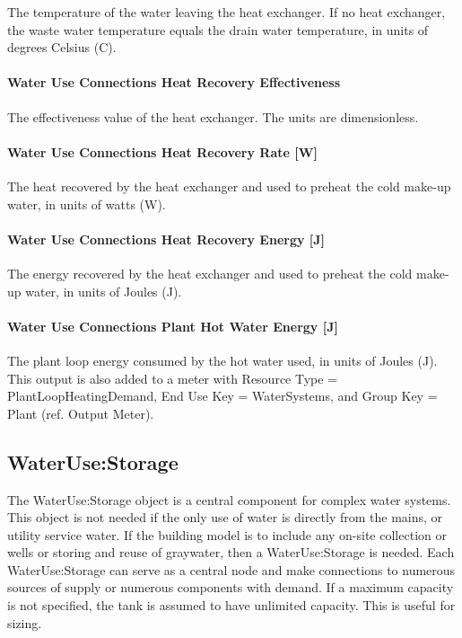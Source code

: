 The temperature of the water leaving the heat exchanger. If no heat exchanger, the waste water temperature equals the drain water temperature, in units of degrees Celsius (C).

\paragraph{\texorpdfstring{Water Use Connections Heat Recovery Effectiveness \protect\hyperlink{section-1}{}}{Water Use Connections Heat Recovery Effectiveness }}\label{water-use-connections-heat-recovery-effectiveness}

The effectiveness value of the heat exchanger. The units are dimensionless.

\paragraph{Water Use Connections Heat Recovery Rate {[}W{]}}\label{water-use-connections-heat-recovery-rate-w}

The heat recovered by the heat exchanger and used to preheat the cold make-up water, in units of watts (W).

\paragraph{Water Use Connections Heat Recovery Energy {[}J{]}}\label{water-use-connections-heat-recovery-energy-j}

The energy recovered by the heat exchanger and used to preheat the cold make-up water, in units of Joules (J).

\paragraph{Water Use Connections Plant Hot Water Energy {[}J{]}}\label{water-use-connections-plant-hot-water-energy-j}

The plant loop energy consumed by the hot water used, in units of Joules (J). This output is also added to a meter with Resource Type = PlantLoopHeatingDemand, End Use Key = WaterSystems, and Group Key = Plant (ref. Output Meter).

\subsection{WaterUse:Storage}\label{waterusestorage}

The WaterUse:Storage object is a central component for complex water systems. This object is not needed if the only use of water is directly from the mains, or utility service water. If the building model is to include any on-site collection or wells or storing and reuse of graywater, then a WaterUse:Storage is needed. Each WaterUse:Storage can serve as a central node and make connections to numerous sources of supply or numerous components with demand. If a maximum capacity is not specified, the tank is assumed to have unlimited capacity. This is useful for sizing.

